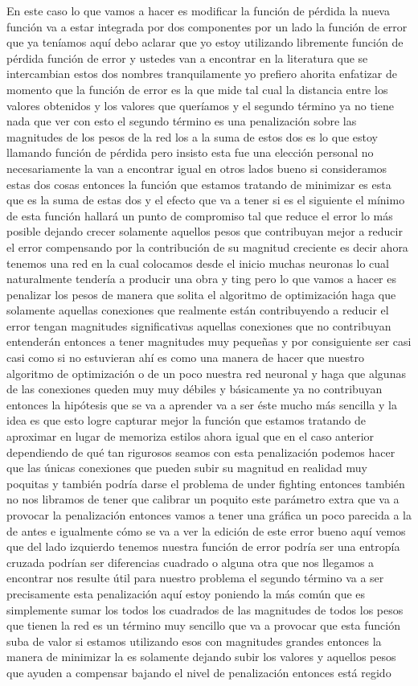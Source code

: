 En este caso lo que vamos a hacer es modificar la función de pérdida la nueva función va a estar integrada por dos componentes por un lado la función de error que ya teníamos aquí debo aclarar que yo estoy utilizando libremente función de pérdida función de error y ustedes van a encontrar en la literatura que se intercambian estos dos nombres tranquilamente yo prefiero ahorita enfatizar de momento que la función de error es la que mide tal cual la distancia entre los valores obtenidos y los valores que queríamos y el segundo término ya no tiene nada que ver con esto el segundo término es una penalización sobre las magnitudes de los pesos de la red los a la suma de estos dos es lo que estoy llamando función de pérdida pero insisto esta fue una elección personal no necesariamente la van a encontrar igual en otros lados bueno si consideramos estas dos cosas entonces la función que estamos tratando de minimizar es esta que es la suma de estas dos y el efecto que va a tener si es el siguiente el mínimo de esta función hallará un punto de compromiso tal que reduce el error lo más posible dejando crecer solamente aquellos pesos que contribuyan mejor a reducir el error compensando por la contribución de su magnitud creciente es decir ahora tenemos una red en la cual colocamos desde el inicio muchas neuronas lo cual naturalmente tendería a producir una obra y ting pero lo que vamos a hacer es penalizar los pesos de manera que solita el algoritmo de optimización haga que solamente aquellas conexiones que realmente están contribuyendo a reducir el error tengan magnitudes significativas aquellas conexiones que no contribuyan entenderán entonces a tener magnitudes muy pequeñas y por consiguiente ser casi casi como si no estuvieran ahí es como una manera de hacer que nuestro algoritmo de optimización o de un poco nuestra red neuronal y haga que algunas de las conexiones queden muy muy débiles y básicamente ya no contribuyan entonces la hipótesis que se va a aprender va a ser éste mucho más sencilla y la idea es que esto logre capturar mejor la función que estamos tratando de aproximar en lugar de memoriza estilos ahora igual que en el caso anterior dependiendo de qué tan rigurosos seamos con esta penalización podemos hacer que las únicas conexiones que pueden subir su magnitud en realidad muy poquitas y también podría darse el problema de under fighting entonces también no nos libramos de tener que calibrar un poquito este parámetro extra que va a provocar la penalización entonces vamos a tener una gráfica un poco parecida a la de antes e igualmente cómo se va a ver la edición de este error bueno aquí vemos que del lado izquierdo tenemos nuestra función de error podría ser una entropía cruzada podrían ser diferencias cuadrado o alguna otra que nos llegamos a encontrar nos resulte útil para nuestro problema el segundo término va a ser precisamente esta penalización aquí estoy poniendo la más común que es simplemente sumar los todos los cuadrados de las magnitudes de todos los pesos que tienen la red es un término muy sencillo que va a provocar que esta función suba de valor si estamos utilizando esos con magnitudes grandes entonces la manera de minimizar la es solamente dejando subir los valores y aquellos pesos que ayuden a compensar bajando el nivel de penalización entonces está regido 